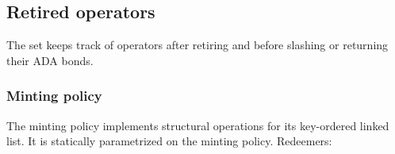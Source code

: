 \documentclass[../midgard.tex]{subfiles}
\begin{document}
\subsection{Retired operators}
\label{h:retired-operators}

The  set keeps track of operators after retiring and before slashing or returning their ADA bonds.

\subsubsection{Minting policy}
\label{h:retired-operators-minting-policy}

The  minting policy implements structural operations for its key-ordered linked list. It is statically parametrized on the  minting policy. Redeemers:
\end{document}
